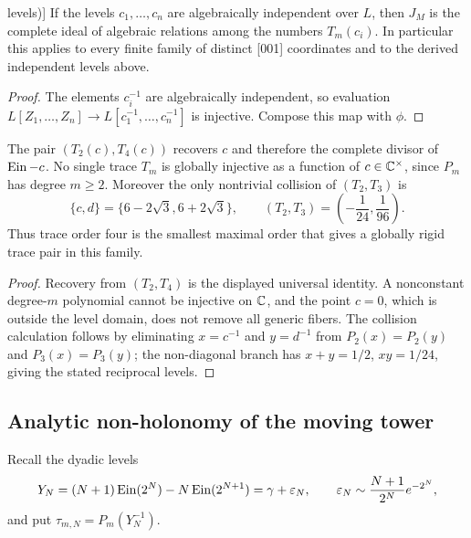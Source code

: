 \begin{corollary}[No hidden cross-level relations (\UPASS{} formally;
\RPASS{} for [001] levels)]
\label{cor:transfer-no-hidden-relations}
If the levels \(c_1,\ldots,c_n\) are algebraically independent over \(L\),
then \(J_M\) is the complete ideal of algebraic relations among the numbers
\(T_m(c_i)\).  In particular this applies to every finite family of
distinct [001] coordinates and to the derived independent levels above.
\end{corollary}

\begin{proof}
The elements \(c_i^{-1}\) are algebraically independent, so evaluation
\(L[Z_1,\ldots,Z_n]\to L[c_1^{-1},\ldots,c_n^{-1}]\) is injective.
Compose this map with \(\phi\).
\end{proof}

\begin{proposition}
\label{prop:transfer-two-moment-rigidity}
The pair \((T_2(c),T_4(c))\) recovers \(c\) and therefore the complete
divisor of \(\operatorname{Ein}-c\).  No single trace \(T_m\) is globally injective as
a function of \(c\in\mathbb C^\times\), since \(P_m\) has degree \(m\ge2\).
Moreover the only nontrivial collision of \((T_2,T_3)\) is
\[
 \{c,d\}=\{6-2\sqrt3,6+2\sqrt3\},
 \qquad
 (T_2,T_3)=\left(-\frac1{24},\frac1{96}\right).
\]
Thus trace order four is the smallest maximal order that gives a globally
rigid trace pair in this family.
\end{proposition}

\begin{proof}
Recovery from \((T_2,T_4)\) is the displayed universal identity.  A
nonconstant degree-\(m\) polynomial cannot be injective on \(\mathbb C\), and
the point \(c=0\), which is outside the level domain, does not remove all
generic fibers.  The collision calculation follows by eliminating
\(x=c^{-1}\) and \(y=d^{-1}\) from \(P_2(x)=P_2(y)\) and
\(P_3(x)=P_3(y)\); the non-diagonal branch has
\(x+y=1/2\), \(xy=1/24\), giving the stated reciprocal levels.
\end{proof}

\subsection{Analytic non-holonomy of the moving tower}

Recall the dyadic levels
\[
 Y_N=(N+1)\operatorname{Ein}(2^N)-N\operatorname{Ein}(2^{N+1})
 =\gamma+\varepsilon_N,
 \qquad
 \varepsilon_N\sim\frac{N+1}{2^N}e^{-2^N},
\]
and put \(\tau_{m,N}=P_m(Y_N^{-1})\).

